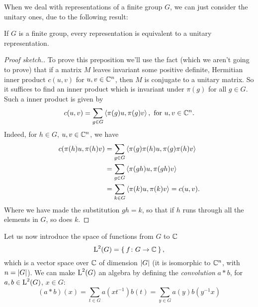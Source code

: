When we deal with representations of a finite group $G$, we can just consider the unitary ones, due to the following result:
\begin{prop}
If $G$ is a finite group, every representation is equivalent to a unitary representation.
\end{prop}
\begin{proof}[Proof sketch.]
To prove this preposition we'll use the fact (which we aren't going to prove) that if a matrix $M$ leaves invariant some positive definite, Hermitian inner product $c(u,v)$ for $u,v \in {\mathbb C}^n$, then $M$ is conjugate to a unitary matrix.
So it suffices to find an inner product which is invariant under $\pi(g)$ for all $g \in G$. Such a inner product is given by 
\[
c(u,v)= \sum_{g \in G} \Braket{ \pi(g)u, \pi(g)v } , \text{ for } u,v \in {\mathbb C}^n.
\]
Indeed, for $h\in G$, $u,v\in {\mathbb C}^n$, we have
\[
\begin{split}
c(\pi(h)u,\pi(h)v) &= \sum_{g \in G} \Braket{ \pi(g)\pi(h)u, \pi(g)\pi(h)v } \\
&=\sum_{g \in G} \Braket{ \pi(gh)u, \pi(gh)v } \\
&=\sum_{k \in G} \Braket{ \pi(k)u, \pi(k)v }= c(u,v).\\
\end{split}
\]
Where we have made the substitution $gh=k$, so that if $h$ runs through all the elements in $G$, so does $k$. 
\end{proof}
Let us now introduce  the space of functions from $G$ to ${\mathbb C}$ 
\begin{equation*}
\operatorname{L}^2(G)=\Set{f\colon G \rightarrow {\mathbb C}},
\end{equation*}
which is a vector space over ${\mathbb C}$ of dimension $\lvert G\rvert$ (it is isomorphic to ${\mathbb C}^n$, with $n=\lvert G\rvert$).
We can make $\operatorname{L}^2(G)$ an algebra by defining the \emph{convolution} $a\ast b$, for $a,b\in \operatorname{L}^2(G)$, $x\in G$:
\begin{equation*}
(a\ast b)(x)=\sum_{t \in G} a(xt^{-1})b(t)=\sum_{y \in G} a(y)b(y^{-1}x)
\end{equation*}
